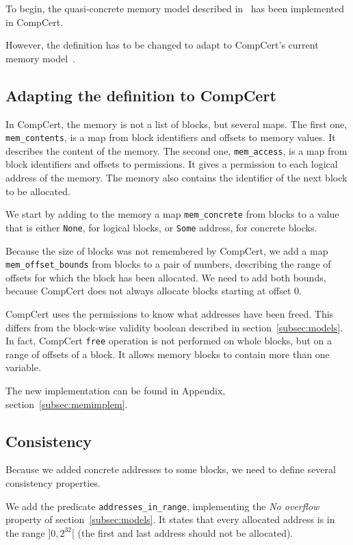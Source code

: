 \label{sec:memupdate}
To begin, the quasi-concrete memory model described in~\cite{DBLP:conf/pldi/KangHMGZV15} has been implemented in CompCert. 

However, the definition has to be changed to adapt to CompCert's current memory model~\cite{leroy:hal-00703441}.

\subsection{Adapting the definition to CompCert}
In CompCert, the memory is not a list of blocks, but several maps.
The first one, \texttt{mem\_contents}, is a map from block identifiers and offsets to memory values. It describes the content of the memory.
The second one, \texttt{mem\_access}, is a map from block identifiers and offsets to permissions. It gives a permission to each logical address of the memory.
The memory also contains the identifier of the next block to be allocated.

We start by adding to the memory a map \texttt{mem\_concrete} from blocks to a value that is either \texttt{None}, for logical blocks, or \texttt{Some} address, for concrete blocks.

Because the size of blocks was not remembered by CompCert, we add a map \texttt{mem\_offset\_bounds} from blocks to a pair of numbers, describing the range of offsets for which the block has been allocated. We need to add both bounds, because CompCert does not always allocate blocks starting at offset 0.

CompCert uses the permissions to know what addresses have been freed. This differs from the block-wise validity boolean described in section~\ref{subsec:models}.
In fact, CompCert \texttt{free} operation is not performed on whole blocks, but on a range of offsets of a block. It allows memory blocks to contain more than one variable.

The new implementation can be found in Appendix, section~\ref{subsec:memimplem}.


\subsection{Consistency}
Because we added concrete addresses to some blocks, we need to define several consistency properties.

We add the predicate \texttt{addresses\_in\_range}, implementing the \textit{No overflow} property of section~\ref{subsec:models}. It states that every allocated address is in the range $]0,2^{32}[$ (the first and last address should not be allocated).

